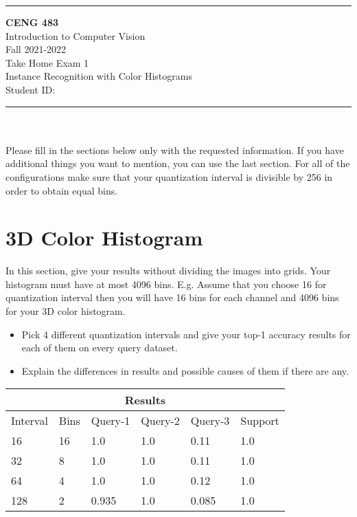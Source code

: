 \documentclass[12pt]{article}
\newcommand{\HRule}{\rule{\linewidth}{1mm}}
\begin{document}
\noindent
\HRule %
\small
\begin{center}
	\LARGE \textbf{CENG 483} \\[4mm]
	\Large Introduction to Computer Vision \\[4mm]
	\normalsize Fall 2021-2022 \\
	\Large Take Home Exam 1 \\
	\Large Instance Recognition with Color Histograms \\
    \Large Student ID: \\
\end{center}
\HRule

\begin{center}
\end{center}
\vspace{-10mm}
\noindent\\ \\ 
Please fill in the sections below only with the requested information. If you have additional things you want to mention, you can use the last section. For all of the configurations make sure that your 
quantization interval is divisible by 256 in order to obtain equal bins.
\section{3D Color Histogram}
In this section, give your results without dividing the images into grids. Your histogram must have at most 4096 bins. E.g. Assume that you choose 16 for quantization interval then you will have 16 bins for each channel and 4096 bins for your 3D color histogram.

\begin{itemize}
\item Pick 4 different quantization intervals and give your top-1 accuracy results for each of them on every query dataset.
\item Explain the differences in results and possible causes of them if there are any.
\end{itemize}


\begin{tabular}{ |p{1.5cm}|p{1.5cm}||p{2cm}|p{2cm}|p{2cm}|p{2cm}|  }
    \hline
    \multicolumn{6}{|c|}{Results} \\
    \hline
    Interval & Bins & Query-1 & Query-2 & Query-3 & Support \\
    \hline
    16  & 16 & 1.0 & 1.0 & 0.11 & 1.0 \\
    \hline
    32  & 8 & 1.0 & 1.0 & 0.11 & 1.0 \\
    \hline
    64  & 4 & 1.0  & 1.0 & 0.12 & 1.0 \\
    \hline
    128 & 2 & 0.935 & 1.0 &  0.085 & 1.0 \\
    \hline
\end{tabular}
\end{document}
